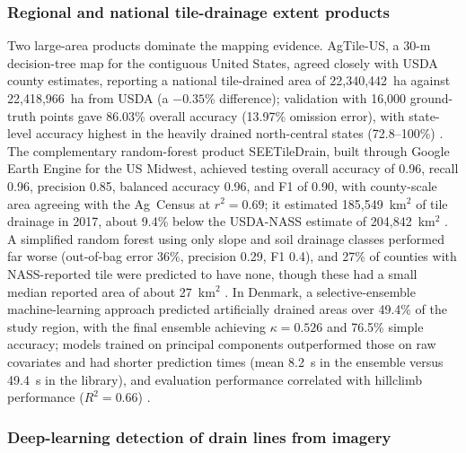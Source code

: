 \subsubsection{Regional and national tile-drainage extent products}

Two large-area products dominate the mapping evidence. AgTile-US, a 30-m
decision-tree map for the contiguous United States, agreed closely with USDA
county estimates, reporting a national tile-drained area of 22{,}340{,}442~ha
against 22{,}418{,}966~ha from USDA (a $-0.35$\% difference); validation with
16{,}000 ground-truth points gave 86.03\% overall accuracy (13.97\% omission
error), with state-level accuracy highest in the heavily drained north-central
states (72.8--100\%) \parencite{Valayamkunnath2020}. The complementary
random-forest product SEETileDrain, built through Google Earth Engine for the US
Midwest, achieved testing overall accuracy of 0.96, recall 0.96, precision 0.85,
balanced accuracy 0.96, and F1 of 0.90, with county-scale area agreeing with the
Ag~Census at $r^2=0.69$; it estimated 185{,}549~km$^2$ of tile drainage in 2017,
about 9.4\% below the USDA-NASS estimate of 204{,}842~km$^2$
\parencite{Wan2024}. A simplified random forest using only slope and soil
drainage classes performed far worse (out-of-bag error 36\%, precision 0.29, F1
0.4), and 27\% of counties with NASS-reported tile were predicted to have none,
though these had a small median reported area of about 27~km$^2$
\parencite{Wan2024}. In Denmark, a selective-ensemble machine-learning approach
predicted artificially drained areas over 49.4\% of the study region, with the
final ensemble achieving $\kappa=0.526$ and 76.5\% simple accuracy; models
trained on principal components outperformed those on raw covariates and had
shorter prediction times (mean 8.2~s in the ensemble versus 49.4~s in the
library), and evaluation performance correlated with hillclimb performance
($R^2=0.66$) \parencite{Moller2018}.

\subsubsection{Deep-learning detection of drain lines from imagery}


